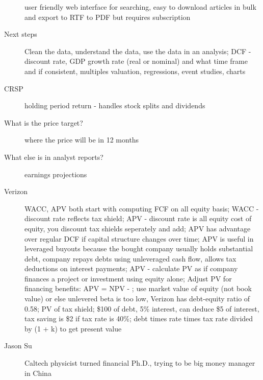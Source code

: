 \documentclass[11pt]{article}
\begin{document}
\begin{description}
  user friendly web interface for searching, easy to download articles in bulk and export to RTF to PDF but requires subscription
\item[Next steps]
  Clean the data, understand the data, use the data in an analysis;
  DCF - discount rate, GDP growth rate (real or nominal) and what time frame and if consistent, multiples valuation, regressions, event studies, charts
\item[CRSP]
  holding period return - handles stock splits and dividends
\item[What is the price target?]
  where the price will be in 12 months
\item[What else is in analyst reports?]
  earnings projections
\item[Verizon]
  WACC, APV both start with computing FCF on all equity basis;
  WACC - discount rate reflects tax shield;
  APV - discount rate is all equity cost of equity, you discount tax shields seperately and add;
  APV has advantage over regular DCF if capital structure changes over time;
  APV is useful in leveraged buyouts because the bought company usually holds substantial debt, company repays debts using unleveraged cash flow, allows tax deductions on interest payments;
  APV - calculate PV as if company finances a project or investment using equity alone;
  Adjust PV for financing benefits: APV = NPV - ;
  use market value of equity (not book value) or else unlevered beta is too low, Verizon has debt-equity ratio of 0.58;
  PV of tax shield; \$100 of debt, 5\% interest, can deduce \$5 of interest, tax saving is \$2 if tax rate is 40\%; debt times rate times tax rate divided by (1 + k) to get present value
\item[Jason Su]
  Caltech physicist turned financial Ph.D., trying to be big money manager in China
\end{description}
\end{document}
